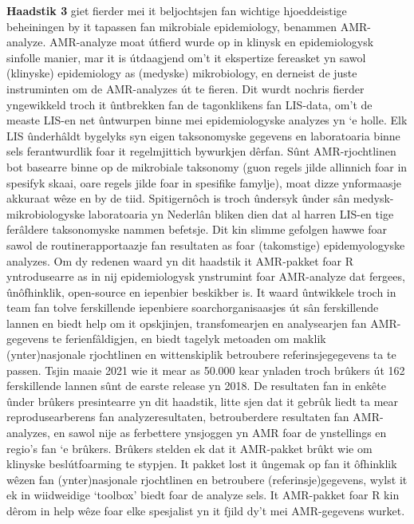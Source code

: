 \documentclass[
]{book}
\begin{document}
\textbf{Haadstik 3} giet fierder mei it beljochtsjen fan wichtige hjoeddeistige beheiningen by it tapassen fan mikrobiale epidemiology, benammen AMR-analyze. AMR-analyze moat útfierd wurde op in klinysk en epidemiologysk sinfolle manier, mar it is útdaagjend om't it ekspertize fereasket yn sawol (klinyske) epidemiology as (medyske) mikrobiology, en derneist de juste instruminten om de AMR-analyzes út te fieren. Dit wurdt nochris fierder yngewikkeld troch it ûntbrekken fan de tagonklikens fan LIS-data, om't de measte LIS-en net ûntwurpen binne mei epidemiologyske analyzes yn `e holle. Elk LIS ûnderhâldt bygelyks syn eigen taksonomyske gegevens en laboratoaria binne sels ferantwurdlik foar it regelmjittich bywurkjen dêrfan. Sûnt AMR-rjochtlinen bot basearre binne op de mikrobiale taksonomy (guon regels jilde allinnich foar in spesifyk skaai, oare regels jilde foar in spesifike famylje), moat dizze ynformaasje akkuraat wêze en by de tiid. Spitigernôch is troch ûndersyk ûnder sân medysk-mikrobiologyske laboratoaria yn Nederlân bliken dien dat al harren LIS-en tige ferâldere taksonomyske nammen befetsje. Dit kin slimme gefolgen hawwe foar sawol de routinerapportaazje fan resultaten as foar (takomstige) epidemyologyske analyzes. Om dy redenen waard yn dit haadstik it AMR-pakket foar R yntrodusearre as in nij epidemiologysk ynstrumint foar AMR-analyze dat fergees, ûnôfhinklik, open-source en iepenbier beskikber is. It waard ûntwikkele troch in team fan tolve ferskillende iepenbiere soarchorganisaasjes út sân ferskillende lannen en biedt help om it opskjinjen, transfomearjen en analysearjen fan AMR-gegevens te ferienfâldigjen, en biedt tagelyk metoaden om maklik (ynter)nasjonale rjochtlinen en wittenskiplik betroubere referinsjegegevens ta te passen. Tsjin maaie 2021 wie it mear as 50.000 kear ynladen troch brûkers út 162 ferskillende lannen sûnt de earste release yn 2018. De resultaten fan in enkête ûnder brûkers presintearre yn dit haadstik, litte sjen dat it gebrûk liedt ta mear reprodusearberens fan analyzeresultaten, betrouberdere resultaten fan AMR-analyzes, en sawol nije as ferbettere ynsjoggen yn AMR foar de ynstellings en regio's fan `e brûkers. Brûkers stelden ek dat it AMR-pakket brûkt wie om klinyske beslútfoarming te stypjen. It pakket lost it ûngemak op fan it ôfhinklik wêzen fan (ynter)nasjonale rjochtlinen en betroubere (referinsje)gegevens, wylst it ek in wiidweidige `toolbox' biedt foar de analyze sels. It AMR-pakket foar R kin dêrom in help wêze foar elke spesjalist yn it fjild dy't mei AMR-gegevens wurket.
\end{document}
